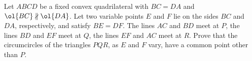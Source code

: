 Let $ABCD$ be a fixed convex quadrilateral
with $BC=DA$ and $\ol{BC} \nparallel \ol{DA}$.
Let two variable points $E$ and $F$ lie on the
sides $BC$ and $DA$, respectively, and satisfy $BE=DF$.
The lines $AC$ and $BD$ meet at $P$,
the lines $BD$ and $EF$ meet at $Q$,
the lines $EF$ and $AC$ meet at $R$.
Prove that the circumcircles of the triangles $PQR$,
as $E$ and $F$ vary, have a common point other than $P$.
